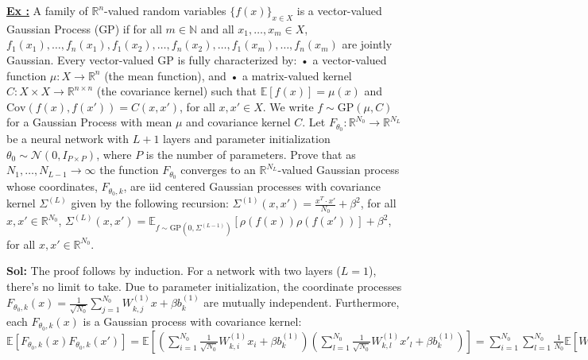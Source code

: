 \documentclass[a4paper,10pt]{article}
\newcounter{exerciseCounter}
\newcommand{\exercise}[1]{%
    \vspace{1mm}
    \stepcounter{exerciseCounter}%
    \color{exerciseBlack}
    \textbf{\underline{Ex \theexerciseCounter:}} #1
}
\newcommand{\solution}[1]{%
    {\color{solutionGray} \textbf{Sol: } #1} %
}
\begin{document}
\begin{scriptsize}
\exercise{A family of $\mathbb{R}^n$-valued random variables $\{f(x)\}_{x\in X}$ is a vector-valued Gaussian Process (GP) if for all $m \in \mathbb{N}$ and all $x_1,\ldots,x_m \in X$, $f_1(x_1),\ldots,f_n(x_1),f_1(x_2),\ldots,f_n(x_2),\ldots,f_1(x_m),\ldots,f_n(x_m)$ are jointly Gaussian. Every vector-valued GP is fully characterized by:
• a vector-valued function $\mu : X \to \mathbb{R}^n$ (the mean function), and
• a matrix-valued kernel $C : X \times X \to \mathbb{R}^{n\times n}$ (the covariance kernel)
such that $\mathbb{E}[f(x)] = \mu(x)$ and $\text{Cov}(f(x),f(x')) = C(x,x')$, for all $x,x' \in X$. We write $f \sim \text{GP}(\mu,C)$ for a Gaussian Process with mean $\mu$ and covariance kernel $C$.
Let $F_{\theta_0} : \mathbb{R}^{N_0} \to \mathbb{R}^{N_L}$ be a neural network with $L+1$ layers and parameter initialization $\theta_0 \sim \mathcal{N}(0,I_{P\times P})$, where $P$ is the number of parameters. Prove that as $N_1,\ldots,N_{L-1} \to \infty$ the function $F_{\theta_0}$ converges to an $\mathbb{R}^{N_L}$-valued Gaussian process whose coordinates, $F_{\theta_0,k}$, are iid centered Gaussian processes with covariance kernel $\Sigma^{(L)}$ given by the following recursion:
$\Sigma^{(1)}(x,x') = \frac{x^T \cdot x'}{N_0} + \beta^2$, for all $x,x' \in \mathbb{R}^{N_0}$,
$\Sigma^{(L)}(x,x') = \mathbb{E}_{f\sim\text{GP}(0,\Sigma^{(L-1)})}[\rho(f(x))\rho(f(x'))] + \beta^2$, for all $x,x' \in \mathbb{R}^{N_0}$.}
\solution{The proof follows by induction.
For a network with two layers ($L=1$), there's no limit to take. Due to parameter initialization, the coordinate processes $F_{\theta_0,k}(x) = \frac{1}{\sqrt{N_0}}\sum_{j=1}^{N_0} W_{k,j}^{(1)}x + \beta b_k^{(1)}$ are mutually independent. Furthermore, each $F_{\theta_0,k}(x)$ is a Gaussian process with covariance kernel:
$\mathbb{E}[F_{\theta_0,k}(x)F_{\theta_0,k}(x')] = \mathbb{E}[(\sum_{i=1}^{N_0}\frac{1}{\sqrt{N_0}}W_{k,i}^{(1)}x_i + \beta b_k^{(1)})(\sum_{l=1}^{N_0}\frac{1}{\sqrt{N_0}}W_{k,l}^{(1)}x'_l + \beta b_k^{(1)})]
=\sum_{i=1}^{N_0}\sum_{l=1}^{N_0}\frac{1}{N_0}\mathbb{E}[W_{k,i}^{(1)}W_{k,l}^{(1)}]x_ix'_l + \beta^2\mathbb{E}[b_k^{(1)}b_k^{(1)}]
=\sum_{i=1}^{N_0}\sum_{l=1}^{N_0}\frac{1}{N_0}\delta_{i,l}x_ix'_l + \beta^2\mathbb{E}[b_k^{(1)}b_k^{(1)}]
= \frac{x^T \cdot x'}{N_0} + \beta^2$

}
\end{scriptsize}
\end{document}
